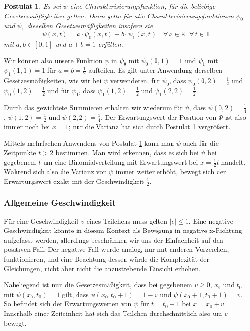 \documentclass[a4paper,12pt,ngerman]{scrartcl}
\theoremstyle{plain}
\theoremstyle{plain}
\theoremstyle{plain}
\newtheorem{postulate}{Postulat}
\theoremstyle{plain}
\newcommand{\T}{\mathbb{T}}
\newcommand{\X}{\mathbb{X}}
\begin{document}
{
\begin{postulate}\label{pos_einstein}
Es sei $\psi$ eine Charakterisierungsfunktion, für die beliebige Gesetzesmäßigkeiten gelten. Dann gelte für alle Charakterisierungsfunktionen $\psi_0$ und $\psi_1$ dieselben Gesetzesmäßigkeiten insofern sie
\[\psi(x,t)=a\cdot\psi_0(x,t)+b\cdot\psi_1(x,t)\quad\forall\,x\in\X\;\;\forall\,t \in\T\]
mit $a,b\in[0,1]$ und $a+b=1$ erfüllen.
\end{postulate}
}

Wir können also unsere Funktion $\psi$ in $\psi_0$ mit $\psi_0(0,1)=1$ und $\psi_1$ mit $\psi_1(1,1)=1$ für $a=b=\frac{1}{2}$ aufteilen. Es gilt unter Anwendung derselben Gesetzesmäßigkeiten, wie wir bei $\psi$ verwendeten, für $\psi_0$, dass $\psi_0(0,2)=\frac{1}{2}$ und $\psi_0(1,2)=\frac{1}{2}$ und für $\psi_1$, dass $\psi_1(1,2)=\frac{1}{2}$ und $\psi_1(2,2)=\frac{1}{2}$. 

Durch das gewichtete Summieren erhalten wir wiederum für $\psi$, dass $\psi(0,2)=\frac{1}{4}$, $\psi(1,2)=\frac{1}{2}$ und $\psi(2,2)=\frac{1}{4}$. Der Erwartungswert der Position von $\Phi$ ist also immer noch bei $x=1$; nur die Varianz hat sich durch Postulat \ref{pos_einstein} vergrößert.

Mittels mehrfachen Anwendens von Postulat \ref{pos_einstein} kann man $\psi$ auch für die Zeitpunkte $t>2$ bestimmen. Man wird erkennen, dass es sich bei $\psi$ bei gegebenem $t$ um eine Binomialverteilung mit Erwartungswert bei $x=\frac{1}{2}t$ handelt. Während sich also die Varianz von $\psi$ immer weiter erhöht, bewegt sich der Erwartungswert exakt mit der Geschwindigkeit $\frac{1}{2}$.

\subsubsection{Allgemeine Geschwindigkeit}

Für eine Geschwindigkeit $v$ eines Teilchens muss gelten $|v|\leq 1$. Eine negative Geschwindigkeit könnte in diesem Kontext als Bewegung in negative x-Richtung aufgefasst werden, allerdings beschränken wir uns der Einfachheit auf den positiven Fall. Der negative Fall würde analog, nur mit anderen Vorzeichen, funktionieren, und eine Beachtung dessen würde die Komplexität der Gleichungen, nicht aber nicht die anzustrebende Einsicht erhöhen.

Naheliegend ist nun die Gesetzesmäßigkeit, dass bei gegebenem $v\geq0$, $x_0$ und $t_0$ mit $\psi(x_0,t_0)=1$ gilt, dass $\psi(x_0,t_0+1)=1-v$ und $\psi(x_0+1,t_0+1)=v$. So befindet sich der Erwartungswerten von $\psi$ für $t=t_0+1$ bei $x=x_0+v$. Innerhalb einer Zeiteinheit hat sich das Teilchen durchschnittlich also um $v$ bewegt. 
\end{document}
